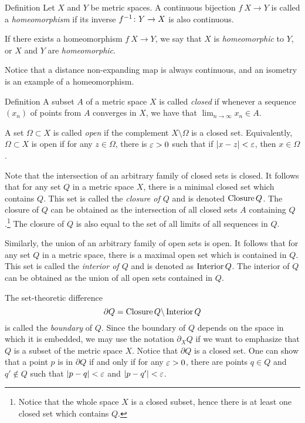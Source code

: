 \begin{thm}{Definition}
Let $X$ and $Y$ be metric spaces.
A continuous bijection $f\:X\to Y$ 
is called a \emph{homeomorphism} 
if its inverse $f^{-1}\:Y\z\to X$ is also continuous.

If there exists a homeomorphism $f\:X\to Y$,
we say that $X$ is \emph{homeomorphic} to $Y$,
or  $X$ and $Y$ are \emph{homeomorphic}.
\end{thm}
Notice that a distance non-expanding map is always continuous, and an isometry is an example of a homeomorphism.




\begin{thm}{Definition}
A subset $A$ of a metric space $X$ is called \emph{closed} if whenever a sequence $(x_n)$ of points from $A$ converges in $X$, we have that $\lim_{n\to\infty} x_n \in A$.

A set $\Omega \subset X$ is called \emph{open} if the complement $X \setminus \Omega$ is a closed set.
Equivalently, $\Omega \subset X$ is open if for any $z\in \Omega$, 
there is $\varepsilon>0$ such that if $|x-z|<\varepsilon$, then $x \in \Omega$.
\end{thm}

Note that the intersection of an arbitrary family of closed sets is closed.
It follows that for any set $Q$ in a metric space $X$, there is a minimal closed set which contains $Q$.
This set is called the \emph{closure of $Q$} and is denoted $\operatorname{Closure} Q$.
The closure of $Q$ can be obtained as the intersection of all closed sets $A$ containing $Q$.\footnote{Notice that the whole space $X$ is a closed subset, hence there is at least one closed set which contains $Q$.}
The closure of $Q$ is also equal to the set of all limits of all sequences in $Q$.


Similarly, the union of an arbitrary family of open sets is open.
It follows that for any set $Q$ in a metric space, there is a maximal open set which is contained in $Q$.
This set is called the \emph{interior of $Q$} and is denoted as $\operatorname{Interior} Q$.
The interior of $Q$ can be obtained as the union of all open sets contained in $Q$.

The set-theoretic difference
$$\partial Q=\operatorname{Closure} Q\backslash \operatorname{Interior} Q$$
is called the \emph{boundary} of $Q$.
Since the boundary of $Q$ depends on the space in which it is embedded, we may use the notation $\partial_X Q$ if we want to emphasize that $Q$ is a subset of the metric space $X$.
Notice that $\partial Q$ is a closed set.
One can show that a point $p$ is in $\partial Q$ if and only if for any $\varepsilon>0$, there are points $q\in Q$ and $q'\notin Q$ such that $|p-q| < \varepsilon$ and $|p-q'|<\varepsilon$.

